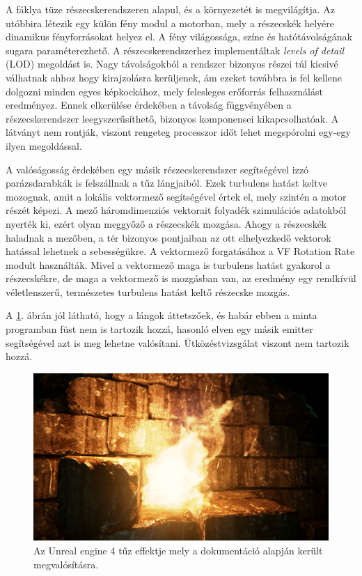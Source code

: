 A fáklya tüze részecskerendszeren alapul, és a környezetét is megvilágítja. Az utóbbira létezik egy külön fény modul a motorban, mely a részecskék helyére dinamikus fényforrásokat helyez el. A fény világossága, színe és hatótávolságának sugara paraméterezhető. A részecskerendszerhez implementáltak \textit{levels of detail} (LOD) megoldást is. Nagy távolságokból a rendszer bizonyos részei túl kicsivé válhatnak ahhoz hogy kirajzolásra kerüljenek, ám ezeket továbbra is fel kellene dolgozni minden egyes képkockához, mely felesleges erőforrás felhasználást eredményez. Ennek elkerülése érdekében a távolság függvényében a részecskerendszer leegyszerűsíthető, bizonyos komponensei kikapcsolhatóak. A látványt nem rontják, viszont rengeteg processzor időt lehet megspórolni egy-egy ilyen megoldással.   \cite{UEngineFireExample}

A valóságosság érdekében egy másik részecskerendszer segítségével izzó parázsdarabkák is felszállnak a tűz lángjaiból. Ezek turbulens hatást keltve mozognak, amit a lokális vektormező segítségével értek el, mely szintén a motor részét képezi. A mező háromdimenziós vektorait folyadék szimulációs adatokból nyerték ki, ezért olyan meggyőző a részecskék mozgása. Ahogy a részecskék haladnak a mezőben, a tér bizonyos pontjaiban az ott elhelyezkedő vektorok hatással lehetnek a sebességükre. A vektormező forgatásához a VF Rotation Rate modult használták. Mivel a vektormező maga is turbulens hatást gyakorol a részecskékre, de maga a vektormező is mozgásban van, az eredmény egy rendkívül véletlenszerű, természetes turbulens hatást keltő részecske mozgás. \cite{UEngineFireExample}

A \ref{fig:UE4fire}. ábrán jól látható, hogy a lángok áttetszőek, és habár ebben a minta programban füst nem is tartozik hozzá, hasonló elven egy másik emitter segítségével azt is meg lehetne valósítani. Ütközéstvizsgálat viszont nem tartozik hozzá.

\begin{figure}[h]
 \includegraphics[width=\textwidth]{kepek/UE4flame.png}
 \caption{Az Unreal engine 4 tűz effektje mely a dokumentáció alapján került megvalósításra. \cite{UEngineFireExample}}
 \label{fig:UE4fire}
\end{figure}

